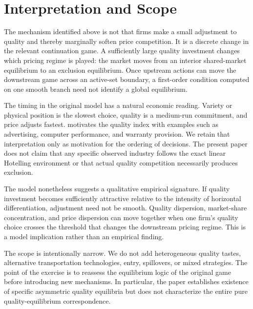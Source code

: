 \section{Interpretation and Scope}\label{sec:interpretation}

The mechanism identified above is not that firms make a small adjustment to quality and thereby marginally soften price competition. It is a discrete change in the relevant continuation game. A sufficiently large quality investment changes which pricing regime is played: the market moves from an interior shared-market equilibrium to an exclusion equilibrium. Once upstream actions can move the downstream game across an active-set boundary, a first-order condition computed on one smooth branch need not identify a global equilibrium.

The timing in the original model has a natural economic reading. Variety or physical position is the slowest choice, quality is a medium-run commitment, and price adjusts fastest. \citet{Economides1989} motivates the quality index with examples such as advertising, computer performance, and warranty provision. We retain that interpretation only as motivation for the ordering of decisions. The present paper does not claim that any specific observed industry follows the exact linear Hotelling environment or that actual quality competition necessarily produces exclusion.

The model nonetheless suggests a qualitative empirical signature. If quality investment becomes sufficiently attractive relative to the intensity of horizontal differentiation, adjustment need not be smooth. Quality dispersion, market-share concentration, and price dispersion can move together when one firm's quality choice crosses the threshold that changes the downstream pricing regime. This is a model implication rather than an empirical finding.

The scope is intentionally narrow. We do not add heterogeneous quality tastes, alternative transportation technologies, entry, spillovers, or mixed strategies. The point of the exercise is to reassess the equilibrium logic of the original game before introducing new mechanisms. In particular, the paper establishes existence of specific asymmetric quality equilibria but does not characterize the entire pure quality-equilibrium correspondence.
